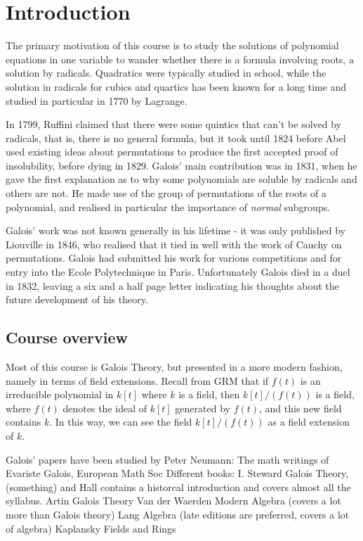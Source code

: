 \documentclass{article}
\begin{document}
\maketitle

\section{Introduction}
The primary motivation of this course is to study the solutions of polynomial equations in one variable to wander whether there is a formula involving roots, a solution by radicals.  Quadratics were typically studied in school, while the solution in radicals for cubics and quartics has been known for a long time and studied in particular in 1770 by Lagrange.

In 1799, Ruffini claimed that there were some quintics that can't be solved by radicals, that is, there is no general formula, but it took until 1824 before Abel used existing ideas about permutations to produce the first accepted proof of insolubility, before dying in 1829.  Galois' main contribution was in 1831, when he gave the first explanation as to why some polynomials are soluble by radicals and others are not. He made use of the group of permutations of the roots of a polynomial, and realised in particular the importance of \emph{normal} subgroups.

Galois' work was not known generally in his lifetime - it was only published by Liouville in 1846, who realised that it tied in well with the work of Cauchy on permutations. Galois had submitted his work for various competitions and for entry into the Ecole Polytechnique in Paris.  Unfortunately Galois died in a duel in 1832, leaving a six and a half page letter indicating his thoughts about the future development of his theory.

\subsection{Course overview}
Most of this course is Galois Theory, but presented in a more modern fashion, namely in terms of field extensions.  Recall from GRM that if $f(t)$ is an irreducible polynomial in $k[t]$ where $k$ is a field, then $k[t]/(f(t))$ is a field, where $f(t)$ denotes the ideal of $k[t]$ generated by $f(t)$, and this new field contains $k$.  In this way, we can see the field $k[t]/(f(t))$ as a field extension of $k$.

Galois' papers have been studied by Peter Neumann:
The math writings of Evariste Galois, European Math Soc
Different books: I. Steward Galois Theory, (something) and Hall
contains a historcal introduction and covers almost all the syllabus.
Artin Galois Theory
Van der Waerden Modern Algebra (covers a lot more than Galois theory)
Lang Algebra (late editions are preferred, covers a lot of algebra)
Kaplansky Fields and Rings
\end{document}
